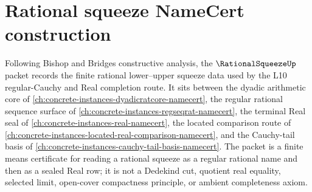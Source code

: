 \chapter{Rational squeeze NameCert construction}
\label{ch:concrete-instances-rational-squeeze-namecert}

Following Bishop and Bridges constructive analysis, the $\RationalSqueezeUp$ packet records the finite rational lower--upper squeeze data used by the L10 regular-Cauchy and Real completion route. It sits between the dyadic arithmetic core of \autoref{ch:concrete-instances-dyadicratcore-namecert}, the regular rational sequence surface of \autoref{ch:concrete-instances-regseqrat-namecert}, the terminal Real seal of \autoref{ch:concrete-instances-real-namecert}, the located comparison route of \autoref{ch:concrete-instances-located-real-comparison-namecert}, and the Cauchy-tail basis of \autoref{ch:concrete-instances-cauchy-tail-basis-namecert}. The packet is a finite means certificate for reading a rational squeeze as a regular rational name and then as a sealed Real row; it is not a Dedekind cut, quotient real equality, selected limit, open-cover compactness principle, or ambient completeness axiom.

